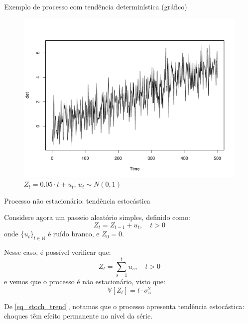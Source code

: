 \documentclass[11pt]{beamer}
\newenvironment{halfwideitemize}{\itemize\addtolength{\itemsep}{0.5em}}{\enditemize}
\begin{document}
\begin{frame}{Exemplo de processo com tendência determinística (gráfico)}
	\begin{figure}
		\caption{$Z_t = 0.05 \cdot t + u_t$, $u_t \sim N(0,1)$}
		\includegraphics[scale=0.4]{graficos/deterministica.pdf}
	\end{figure}
\end{frame}

\begin{frame}{Processo não estacionário: tendência estocástica}
	\begin{halfwideitemize}
		\item Considere agora um {\color{blue}passeio aleatório simples}, definido como:
		\begin{equation}
			\label{eq_rw}
			Z_t = Z_{t-1} + u_t, \quad t > 0
		\end{equation}
		onde $\{u_t\}_{t \in \mathbb{N}}$ é ruído branco, e $Z_0 = 0$. 
		\item Nesse caso, é possível verificar que:
		\begin{equation}
			\label{eq_stoch_trend}
			Z_t = \sum_{s=1}^t u_s, \quad t > 0
		\end{equation}
		e vemos que o processo é não estacionário, visto que:
		\begin{equation*}
			\mathbb{V}[Z_t] = t \cdot \sigma^2_u
		\end{equation*}
		\item De \eqref{eq_stoch_trend}, notamos que o processo apresenta {\color{blue}tendência estocástica}: choques têm efeito permanente no nível da série.
	\end{halfwideitemize}
	
\end{frame}
\end{document}
